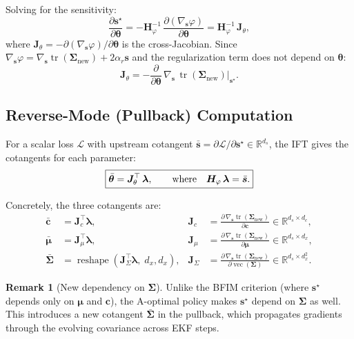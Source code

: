 \documentclass[11pt]{article}
\newcommand{\R}{\mathbb{R}}
\newcommand{\tr}{\operatorname{tr}}
\newcommand{\ve}{\operatorname{vec}}
\newcommand{\bs}{\bm{s}}
\newcommand{\bc}{\bm{c}}
\newcommand{\bmu}{\bm{\mu}}
\newcommand{\bla}{\bm{\lambda}}
\newcommand{\sstar}{\bs^{\star}}
\newcommand{\Snew}{\bm{\Sigma}_{\mathrm{new}}}
\theoremstyle{definition}
\newtheorem{remark}{Remark}
\begin{document}
Solving for the sensitivity:
\begin{equation}
  \frac{\partial \sstar}{\partial \bm{\theta}}
  = -\bm{H}_\varphi^{-1}\,
    \frac{\partial (\nabla_{\bs}\varphi)}{\partial \bm{\theta}}
  = \bm{H}_\varphi^{-1}\,\bm{J}_\theta,
  \label{eq:sensitivity}
\end{equation}
where $\bm{J}_\theta = -\partial(\nabla_{\bs}\varphi)/\partial\bm{\theta}$
is the cross-Jacobian.  Since $\nabla_{\bs}\varphi = \nabla_{\bs}\tr(\Snew)
+ 2\alpha_r \bs$ and the regularization term does not depend on $\bm{\theta}$:
\begin{equation}
  \bm{J}_\theta
  = -\frac{\partial}{\partial \bm{\theta}}\,
    \nabla_{\bs}\,\tr(\Snew)\big|_{\sstar}.
\end{equation}

\subsection{Reverse-Mode (Pullback) Computation}

For a scalar loss $\mathcal{L}$ with upstream cotangent
$\bar{\bs} = \partial\mathcal{L}/\partial\sstar \in \R^{d_s}$, the IFT
gives the cotangents for each parameter:
\begin{equation}
  \boxed{%
    \bar{\bm{\theta}} = \bm{J}_\theta^\top\,\bla,
    \qquad\text{where}\quad
    \bm{H}_\varphi\,\bla = \bar{\bs}.
  }
  \label{eq:pullback}
\end{equation}

Concretely, the three cotangents are:
\begin{align}
  \bar{\bc}   &= \bm{J}_c^\top \bla,   &
  \bm{J}_c &= \frac{\partial\,\nabla_{\bs}\tr(\Snew)}{\partial \bc}\in\R^{d_s\times d_c},
  \label{eq:cbar} \\[4pt]
  \bar{\bmu}  &= \bm{J}_\mu^\top \bla,  &
  \bm{J}_\mu &= \frac{\partial\,\nabla_{\bs}\tr(\Snew)}{\partial \bmu}\in\R^{d_s\times d_x},
  \label{eq:mubar} \\[4pt]
  \bar{\bm{\Sigma}}
              &= \operatorname{reshape}(\bm{J}_\Sigma^\top \bla,\; d_x, d_x), &
  \bm{J}_\Sigma &= \frac{\partial\,\nabla_{\bs}\tr(\Snew)}{\partial\ve(\bm{\Sigma})}
  \in\R^{d_s\times d_x^2}.
  \label{eq:Sigmabar}
\end{align}

\begin{remark}[New dependency on $\bm{\Sigma}$]
Unlike the BFIM criterion (where $\sstar$ depends only on $\bmu$ and $\bc$),
the A-optimal policy makes $\sstar$ depend on $\bm{\Sigma}$ as well.
This introduces a new cotangent $\bar{\bm{\Sigma}}$ in the pullback,
which propagates gradients through the evolving covariance across EKF
steps.
\end{remark}
\end{document}
